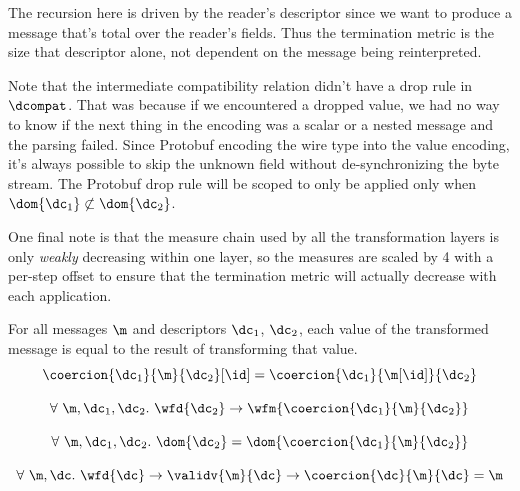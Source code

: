 The recursion here is driven by the reader's descriptor since we want to produce
a message that's total over the reader's fields. Thus the termination metric is
the size that descriptor alone, not dependent on the message being
reinterpreted.

Note that the intermediate compatibility relation didn't have a drop rule in
$\dcompat$. That was because if we encountered a dropped value, we had no way to know
if the next thing in the encoding was a scalar or a nested message and the
parsing failed. Since Protobuf encoding the wire type into the value encoding,
it's always possible to skip the unknown field without de-synchronizing the byte
stream. The Protobuf drop rule will be scoped to only be applied only when
$\dom{\dc_1} \not \subset \dom{\dc_2}$.

One final note is that the measure chain used by all the transformation layers
is only \emph{weakly} decreasing within one layer, so the measures are scaled by
4 with a per-step offset to ensure that the termination metric will actually
decrease with each application. 

\vspace{1em}
\begin{theorem}
  For all messages $\m$ and descriptors $\dc_1$, $\dc_2$, each value of the
  transformed message is equal to the result of transforming that value.
  \[ \coercion{\dc_1}{\m}{\dc_2}[\id] = \coercion{\dc_1}{\m[\id]}{\dc_2} \]
\end{theorem}

\vspace{1em}
\begin{theorem}[Transform WF]\label{thm:trans-wf}
  \[ \forall\ \m, \dc_1, \dc_2.\ \wfd{\dc_2} \rightarrow \wfm{\coercion{\dc_1}{\m}{\dc_2}} \]
\end{theorem}

\vspace{1em}
\begin{theorem}\label{thm:trans-total}
  \[ \forall\ \m, \dc_1, \dc_2.\ \dom{\dc_2} = \dom{\coercion{\dc_1}{\m}{\dc_2}} \]
\end{theorem}

\vspace{1em}
\begin{theorem}\label{thm:trans-self}
  \[ \forall\ \m, \dc.\ \wfd{\dc} \rightarrow \validv{\m}{\dc} \rightarrow \coercion{\dc}{\m}{\dc} = \m \]
\end{theorem}

